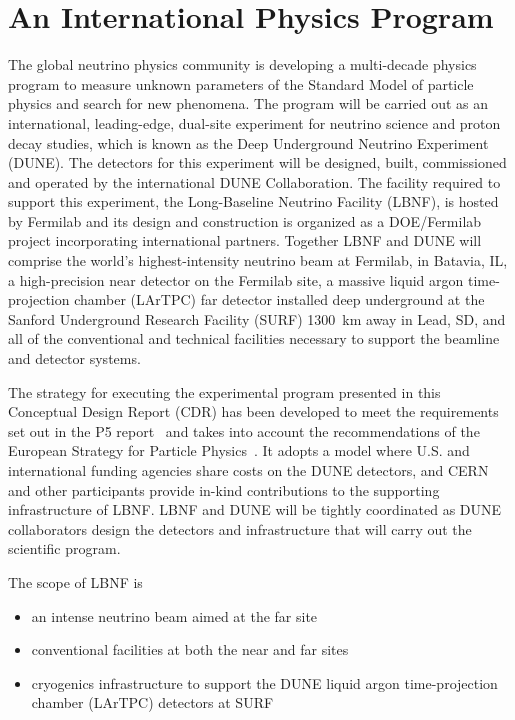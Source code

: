 
\section{An International Physics Program}

The global neutrino physics community is developing a multi-decade
physics program to measure unknown parameters of the Standard Model of
particle physics and search for new phenomena.  The program will be carried out as an international,
leading-edge, dual-site experiment for neutrino science and proton decay studies, which 
is known as the Deep Underground Neutrino Experiment (DUNE).
The detectors for this experiment will be designed, built, commissioned and operated by the international DUNE Collaboration. The facility required to support this experiment, the Long-Baseline Neutrino Facility (LBNF), is hosted by Fermilab and its design and construction is organized as a DOE/Fermilab project incorporating international partners. Together LBNF and DUNE will comprise the world's highest-intensity neutrino beam at Fermilab, in Batavia, IL, a high-precision near detector on the Fermilab site, a massive liquid argon time-projection chamber (LArTPC) far detector installed deep underground at the Sanford Underground Research Facility (SURF) \SI{1300}{\km} away in Lead, SD, and all of the conventional and technical facilities necessary to support the beamline and detector systems. 


The strategy for executing the experimental program presented in this Conceptual 
Design Report (CDR) has been developed to meet the requirements 
set out in the P5 report~\cite{p5report} and takes into account the recommendations of the European Strategy for Particle Physics~\cite{ESPP-2012}. It adopts a model where U.S. and international funding agencies 
share costs on the DUNE detectors, and CERN and other participants provide in-kind contributions 
to the supporting infrastructure of LBNF. LBNF and DUNE will be tightly coordinated as DUNE collaborators 
design the detectors and infrastructure that will carry out the scientific program.
  
The scope of LBNF is
\begin{itemize}
\item an intense neutrino beam aimed at the far site
\item conventional facilities at both the near and far sites
\item cryogenics infrastructure to support the DUNE
  liquid argon time-projection chamber (LArTPC) detectors at SURF
\end{itemize}

